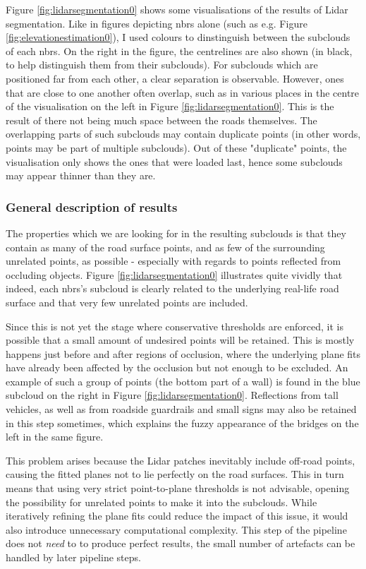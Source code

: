 Figure \ref{fig:lidarsegmentation0} shows some visualisations of the results of Lidar segmentation. Like in figures depicting \ac{nbrs} alone (such as e.g. Figure \ref{fig:elevationestimation0}), I used colours to dinstinguish between the subclouds of each \ac{nbrs}. On the right in the figure, the centrelines are also shown (in black, to help distinguish them from their subclouds). For subclouds which are positioned far from each other, a clear separation is observable. However, ones that are close to one another often overlap, such as in various places in the centre of the visualisation on the left in Figure \ref{fig:lidarsegmentation0}. This is the result of there not being much space between the roads themselves. The overlapping parts of such subclouds may contain duplicate points (in other words, points may be part of multiple subclouds). Out of these "duplicate" points, the visualisation only shows the ones that were loaded last, hence some subclouds may appear thinner than they are.

\subsubsection{General description of results}

The properties which we are looking for in the resulting subclouds is that they contain as many of the road surface points, and as few of the surrounding unrelated points, as possible - especially with regards to points reflected from occluding objects. Figure \ref{fig:lidarsegmentation0} illustrates quite vividly that indeed, each \ac{nbrs}'s subcloud is clearly related to the underlying real-life road surface and that very few unrelated points are included.

Since this is not yet the stage where conservative thresholds are enforced, it is possible that a small amount of undesired points will be retained. This is mostly happens just before and after regions of occlusion, where the underlying plane fits have already been affected by the occlusion but not enough to be excluded. An example of such a group of points (the bottom part of a wall) is found in the blue subcloud on the right in Figure \ref{fig:lidarsegmentation0}. Reflections from tall vehicles, as well as from roadside guardrails and small signs may also be retained in this step sometimes, which explains the fuzzy appearance of the bridges on the left in the same figure.

This problem arises because the Lidar patches inevitably include off-road points, causing the fitted planes not to lie perfectly on the road surfaces. This in turn means that using very strict point-to-plane thresholds is not advisable, opening the possibility for unrelated points to make it into the subclouds. While iteratively refining the plane fits could reduce the impact of this issue, it would also introduce unnecessary computational complexity. This step of the pipeline does not \textit{need} to to produce perfect results, the small number of artefacts can be handled by later pipeline steps. 

